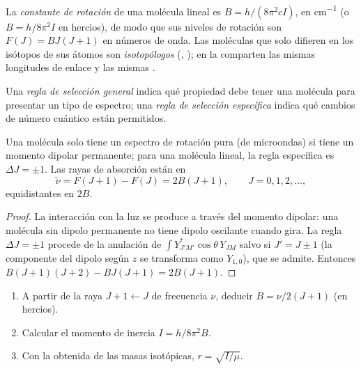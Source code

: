 \begin{definition}\label{def:b3:rovibrational-spectroscopy:rotational-constant}
La \emph{constante de rotación} de una molécula lineal
es $B = h/(8\pi^2cI)$, en \unit{cm^{-1}} (o $B = h/8\pi^2I$ en hercios), de modo que sus
niveles de rotación son $F(J) = BJ(J+1)$ en números de onda. Las moléculas que solo difieren
en los isótopos de sus átomos son \emph{isotopólogos}
(, ); en la 
comparten las mismas longitudes de enlace y las mismas .
\end{definition}

\begin{definition}\label{def:b3:rovibrational-spectroscopy:selection}
Una \emph{regla de selección general} indica qué
propiedad debe tener una molécula para presentar un tipo de espectro; una
\emph{regla de selección específica} indica qué
cambios de número cuántico están permitidos.
\end{definition}

\begin{proposition}\label{prop:b3:rovibrational-spectroscopy:rotational-lines}
Una molécula solo tiene un espectro de rotación pura (de microondas) si tiene un
momento dipolar permanente; para una molécula lineal, la regla específica es $\Delta J
= \pm1$. Las rayas de absorción están en
\[
\tilde\nu = F(J+1) - F(J) = 2B(J + 1), \qquad J = 0, 1, 2, \dots,
\]
equidistantes en $2B$.
\end{proposition}

\begin{proof}
La interacción con la luz se produce a través del momento dipolar: una molécula sin
dipolo permanente no tiene dipolo oscilante cuando gira. La regla $\Delta J
= \pm1$ procede de la anulación de $\int Y_{J'M'}^*\cos\theta\,Y_{JM}$ salvo si $J' = J
\pm 1$ (la componente del dipolo según $z$ se transforma como $Y_{1,0}$), que se admite.
Entonces $B(J+1)(J+2) - BJ(J+1) = 2B(J+1)$.
\end{proof}

\begin{method}\label{met:b3:rovibrational-spectroscopy:bond-length}
\begin{enumerate}
  \item A partir de la raya $J + 1 \leftarrow J$ de frecuencia $\nu$, deducir $B =
        \nu/2(J+1)$ (en hercios).
  \item Calcular el momento de inercia $I = h/8\pi^2B$.
  \item Con la  obtenida de las masas isotópicas, $r = \sqrt{I/\mu}$.
\end{enumerate}
\end{method}

